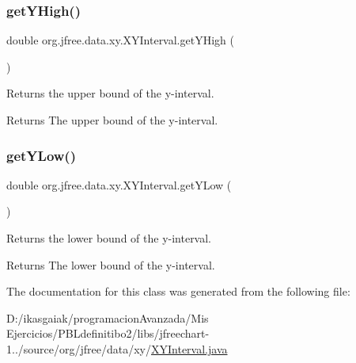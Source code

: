 \subsubsection{\texorpdfstring{get\+Y\+High()}{getYHigh()}}
{\footnotesize\ttfamily double org.\+jfree.\+data.\+xy.\+X\+Y\+Interval.\+get\+Y\+High (\begin{DoxyParamCaption}{ }\end{DoxyParamCaption})}

Returns the upper bound of the y-\/interval.

\begin{DoxyReturn}{Returns}
The upper bound of the y-\/interval. 
\end{DoxyReturn}
\mbox{\label{classorg_1_1jfree_1_1data_1_1xy_1_1_x_y_interval_a1df5839a2c46e50b9a2d81c83861812d}} 
\subsubsection{\texorpdfstring{get\+Y\+Low()}{getYLow()}}
{\footnotesize\ttfamily double org.\+jfree.\+data.\+xy.\+X\+Y\+Interval.\+get\+Y\+Low (\begin{DoxyParamCaption}{ }\end{DoxyParamCaption})}

Returns the lower bound of the y-\/interval.

\begin{DoxyReturn}{Returns}
The lower bound of the y-\/interval. 
\end{DoxyReturn}


The documentation for this class was generated from the following file\+:\begin{DoxyCompactItemize}
\item 
D\+:/ikasgaiak/programacion\+Avanzada/\+Mis Ejercicios/\+P\+B\+Ldefinitibo2/libs/jfreechart-\/1../source/org/jfree/data/xy/\mbox{\hyperlink{_x_y_interval_8java}{X\+Y\+Interval.\+java}}\end{DoxyCompactItemize}
